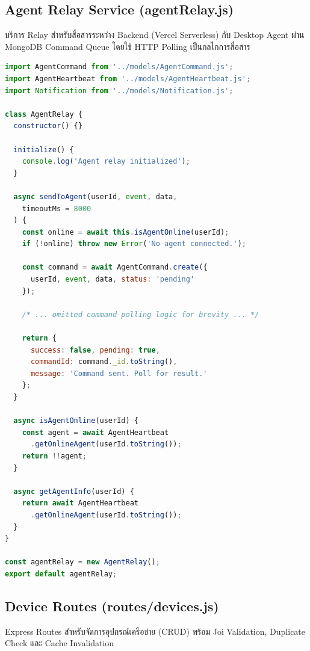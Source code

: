 \subsection{Agent Relay Service (agentRelay.js)}
\hspace*{1.3em}
บริการ Relay สำหรับสื่อสารระหว่าง Backend (Vercel Serverless) กับ Desktop Agent ผ่าน MongoDB Command Queue โดยใช้ HTTP Polling เป็นกลไกการสื่อสาร

\begin{lstlisting}[language=JavaScript, caption={services/agentRelay.js -- Agent Relay (HTTP Polling)}]
import AgentCommand from '../models/AgentCommand.js';
import AgentHeartbeat from '../models/AgentHeartbeat.js';
import Notification from '../models/Notification.js';

class AgentRelay {
  constructor() {}

  initialize() {
    console.log('Agent relay initialized');
  }

  async sendToAgent(userId, event, data,
    timeoutMs = 8000
  ) {
    const online = await this.isAgentOnline(userId);
    if (!online) throw new Error('No agent connected.');

    const command = await AgentCommand.create({
      userId, event, data, status: 'pending'
    });
    
    /* ... omitted command polling logic for brevity ... */

    return {
      success: false, pending: true,
      commandId: command._id.toString(),
      message: 'Command sent. Poll for result.'
    };
  }

  async isAgentOnline(userId) {
    const agent = await AgentHeartbeat
      .getOnlineAgent(userId.toString());
    return !!agent;
  }

  async getAgentInfo(userId) {
    return await AgentHeartbeat
      .getOnlineAgent(userId.toString());
  }
}

const agentRelay = new AgentRelay();
export default agentRelay;
\end{lstlisting}

\subsection{Device Routes (routes/devices.js)}
\hspace*{1.3em}
Express Routes สำหรับจัดการอุปกรณ์เครือข่าย (CRUD) พร้อม Joi Validation, Duplicate Check และ Cache Invalidation

